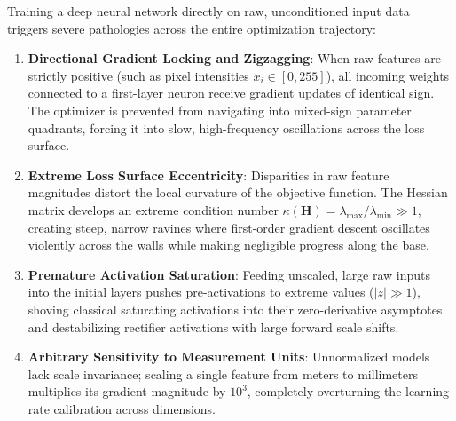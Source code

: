 Training a deep neural network directly on raw, unconditioned input data triggers severe pathologies across the entire optimization trajectory:
\begin{enumerate}[leftmargin=*]
  \item \textbf{Directional Gradient Locking and Zigzagging}: When raw features are strictly positive (such as pixel intensities $x_i \in [0, 255]$), all incoming weights connected to a first-layer neuron receive gradient updates of identical sign. The optimizer is prevented from navigating into mixed-sign parameter quadrants, forcing it into slow, high-frequency oscillations across the loss surface.
  \item \textbf{Extreme Loss Surface Eccentricity}: Disparities in raw feature magnitudes distort the local curvature of the objective function. The Hessian matrix develops an extreme condition number $\kappa(\mathbf{H}) = \lambda_{\max} / \lambda_{\min} \gg 1$, creating steep, narrow ravines where first-order gradient descent oscillates violently across the walls while making negligible progress along the base.
  \item \textbf{Premature Activation Saturation}: Feeding unscaled, large raw inputs into the initial layers pushes pre-activations to extreme values ($|z| \gg 1$), shoving classical saturating activations into their zero-derivative asymptotes and destabilizing rectifier activations with large forward scale shifts.
  \item \textbf{Arbitrary Sensitivity to Measurement Units}: Unnormalized models lack scale invariance; scaling a single feature from meters to millimeters multiplies its gradient magnitude by $10^3$, completely overturning the learning rate calibration across dimensions.
\end{enumerate}

